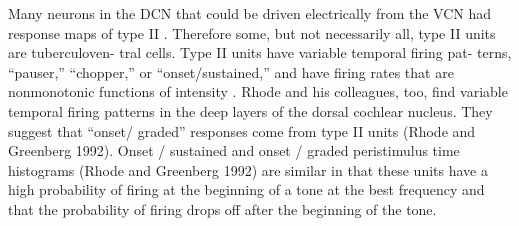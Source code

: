  Many neurons in the DCN that could be driven electrically
 from the VCN had response maps of type II \citep{Young:1980}.
Therefore
 some, but not necessarily all, type II units are tuberculoven-
 tral cells. Type II units have variable temporal firing pat-
 terns, “pauser,” “chopper,” or “onset/sustained,”
 and have firing rates that are nonmonotonic
 functions of intensity \citep{ShofnerYoung:1985}. Rhode and his colleagues,
 too, find variable temporal firing patterns in the deep layers
 of the dorsal cochlear nucleus. They suggest that “onset/
 graded” responses come from type II units (Rhode and
 Greenberg 1992). Onset / sustained \citep{ShofnerYoung:1985} and onset / graded peristimulus
 time histograms (Rhode and Greenberg 1992) are similar in that these units
 have a high probability of firing at the beginning of a tone at
 the best frequency and that the probability of firing drops
 off after the beginning of the tone.










